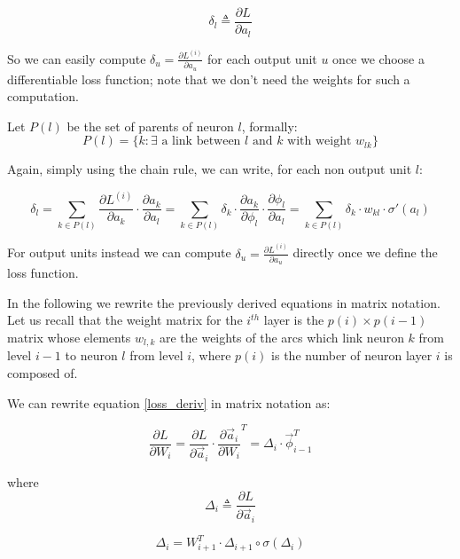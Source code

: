 \begin{equation}
\delta_l \triangleq \frac{\partial L}{\partial a_l}
\end{equation}



So we can easily compute $\delta_u = \frac{\partial L^{(i)}}{\partial a_u} $ for each output unit $u$ once we choose a differentiable loss function; note
that we don't need the weights for such a computation. 

Let $P(l)$ be the set of parents of neuron $l$, formally:
\begin{equation} 
P(l) = \{ k: \exists \text{ a link between $l$ and $k$ with weight } w_{lk} \}
\end{equation}

Again, simply using the chain rule, we can write, for each non output unit $l$:

\begin{equation}
\label{loss_deriv}
\delta_l = \sum_{k\in P(l)} \frac{\partial L^{(i)}}{\partial a_k} \cdot \frac{\partial a_k}{\partial a_l}= \sum_{k\in P(l)} \delta_k \cdot 
\frac{\partial a_k}{\partial \phi_l} \cdot \frac{\partial \phi_l}{\partial a_l} = \sum_{k\in P(l)} \delta_k \cdot 
w_{kl} \cdot \sigma'(a_l)
\end{equation}


For output units instead we can compute $\delta_u = \frac{\partial L^{(i)}}{\partial a_u} $ directly once we define the loss function.


In the following we rewrite the previously derived equations in matrix notation.
Let us recall that the weight matrix for the $i^{th}$ layer is the $p(i) \times p(i-1)$ matrix whose elements $w_{l,k}$ are the weights of the arcs which link neuron $k$ from level $i-1$ to neuron $l$ from level $i$, where
$p(i)$ is the number of neuron layer $i$ is composed of.


We can rewrite equation \ref{loss_deriv} in matrix notation as:

\begin{equation}
 \frac{\partial L}{\partial W_i} = \frac{\partial L}{\partial \vec{a}_{i}} \cdot\frac{\partial \vec{a}_{i}}{\partial W_i}^T =
 \Delta_i \cdot \vec{\phi}_{i-1}^T
\end{equation}

where
\begin{equation}
\Delta_i  \triangleq  \frac{\partial L}{\partial \vec{a}_{i}} 
\end{equation}

\begin{equation}
 \Delta_i = W_{i+1}^T \cdot \Delta_{i+1} \circ \sigma(\Delta_i)
\end{equation} 
